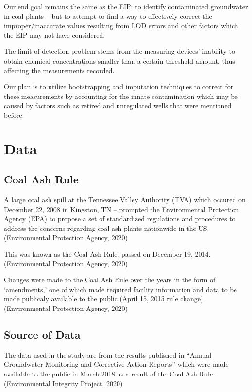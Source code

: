 \documentclass[12pt, twoside]{amherstthesis}
\begin{document}
Our end goal remains the same as the EIP: to identify contaminated groundwater in coal plants -- but to attempt to find a way to effectively correct the improper/inaccurate values resulting from LOD errors and other factors which the EIP may not have considered.

The limit of detection problem stems from the measuring devices' inability to obtain chemical concentrations smaller than a certain threshold amount, thus affecting the measurements recorded.

Our plan is to utilize bootstrapping and imputation techniques to correct for these measurements by accounting for the innate contamination which may be caused by factors such as retired and unregulated wells that were mentioned before.

\hypertarget{data}{%
\section{Data}\label{data}}

\hypertarget{coalashrule}{%
\subsection{Coal Ash Rule}\label{coalashrule}}

A large coal ash spill at the Tennessee Valley Authority (TVA) which occured on December 22, 2008 in Kingston, TN -- prompted the Environmental Protection Agency (EPA) to propose a set of standardized regulations and procedures to address the concerns regarding coal ash plants nationwide in the US. (Environmental Protection Agency, 2020)

This was known as the Coal Ash Rule, passed on December 19, 2014. (Environmental Protection Agency, 2020)

Changes were made to the Coal Ash Rule over the years in the form of `amendments,' one of which made required facility information and data to be made publicaly available to the public (April 15, 2015 rule change) (Environmental Protection Agency, 2020)

\hypertarget{source-of-data}{%
\subsection{Source of Data}\label{source-of-data}}

The data used in the study are from the results published in ``Annual Groundwater Monitoring and Corrective Action Reports'' which were made available to the public in March 2018 as a result of the Coal Ash Rule. (Environmental Integrity Project, 2020)
\end{document}
